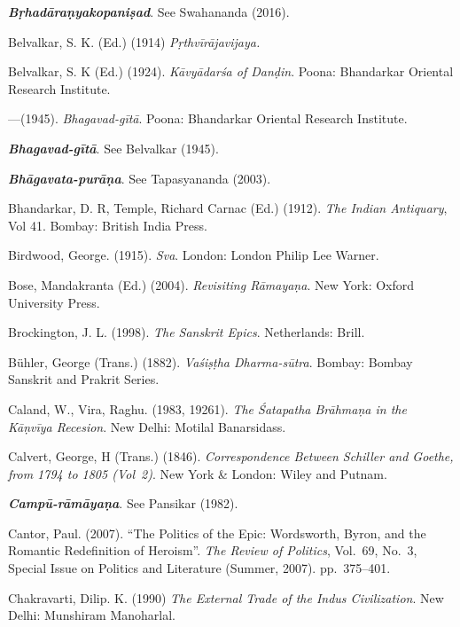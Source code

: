 \begin{thebibliography}{99}
{\sl\bfseries Bṛhadāraṇyakopaniṣad}. See Swahananda (2016).

Belvalkar, S. K. (Ed.) (1914) {\sl Pṛthvīrājavijaya.}

Belvalkar, S. K (Ed.) (1924). {\sl Kāvyādarśa of Danḍin}.  Poona: Bhandarkar Oriental Research Institute. 

---\kern3pt(1945). {\sl Bhagavad-gītā}. Poona: Bhandarkar Oriental Research Institute. 

{\sl\bfseries Bhagavad-gītā}. See Belvalkar (1945).

{\sl\bfseries Bhāgavata-purāṇa}. See Tapasyananda (2003). 

Bhandarkar, D. R, Temple, Richard Carnac (Ed.) (1912). {\sl The Indian Antiquary}, Vol 41. Bombay: British India Press. 

Birdwood, George. (1915). {\sl Sva}. London: London Philip Lee Warner. 

Bose, Mandakranta (Ed.) (2004). {\sl Revisiting Rāmayaṇa}. New York: Oxford University Press.

Brockington, J. L. (1998). {\sl The Sanskrit Epics}. Netherlands: Brill.

Bühler, George (Trans.) (1882). {\sl Vaśiṣṭha Dharma-sūtra}. Bombay: Bombay Sanskrit and Prakrit Series. 

Caland, W., Vira, Raghu. (1983, 19261). {\sl The Śatapatha Brāhmaṇa in the Kāṇvīya Recesion}. New Delhi: Motilal Banarsidass. 

Calvert, George, H (Trans.) (1846). {\sl Correspondence Between Schiller and Goethe, from 1794 to 1805 (Vol~2)}. New York \& London: Wiley and Putnam.  

{\sl\bfseries Campū-rāmāyaṇa}. See Pansikar (1982).

Cantor, Paul. (2007). “The Politics of the Epic: Wordsworth, Byron, and the Romantic Redefinition of Heroism”. {\sl The Review of Politics}, Vol.~69, No.~3, Special Issue on Politics and Literature (Summer, 2007). pp.~375--401.

Chakravarti, Dilip. K. (1990) {\sl The External Trade of the Indus Civilization}. New Delhi: Munshiram Manoharlal. 


\end{thebibliography}
